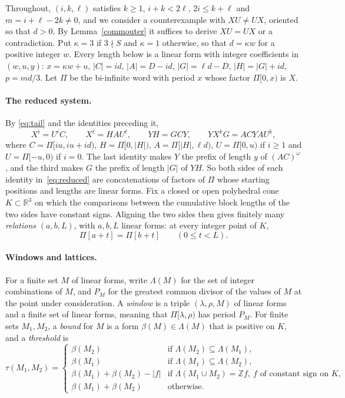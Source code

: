 Throughout, \((i,k,\ell)\) satisfies \(k\ge1\), \(i+k<2\ell\), \(2i\le k+\ell\) and \(m=i+\ell-2k\ne0\), and we consider a counterexample with \(XU\ne UX\), oriented so that \(d>0\). By Lemma~\ref{commouter} it suffices to derive \(XU=UX\) or a contradiction. Put \(\kappa=3\) if \(3\nmid S\) and \(\kappa=1\) otherwise, so that \(d=\kappa w\) for a positive integer \(w\). Every length below is a linear form with integer coefficients in \((w,u,y)\): \(x=\kappa w+u\), \(|C|=id\), \(|A|=D-id\), \(|G|=\ell d-D\), \(|H|=|G|+id\), \(p=md/3\). Let \(\Pi\) be the bi-infinite word with period \(x\) whose factor \(\Pi[0,x)\) is \(X\).

\paragraph{The reduced system.} By \eqref{eq:tail} and the identities preceding it,
\begin{equation}\label{eq:reduced}
X^i=U^iC,\qquad X^\ell=HAU^\ell,\qquad YH=GCY,\qquad YX^kG=ACYAU^k,
\end{equation}
where \(C=\Pi[iu,iu+id)\), \(H=\Pi[0,|H|)\), \(A=\Pi[|H|,\ell d)\), \(U=\Pi[0,u)\) if \(i\ge1\) and \(U=\Pi[-u,0)\) if \(i=0\). The last identity makes \(Y\) the prefix of length \(y\) of \((AC)^\omega\), and the third makes \(G\) the prefix of length \(|G|\) of \(YH\). So both sides of each identity in~\eqref{eq:reduced} are concatenations of factors of \(\Pi\) whose starting positions and lengths are linear forms. Fix a closed or open polyhedral cone \(K\subset\mathbb R^3\) on which the comparisons between the cumulative block lengths of the two sides have constant signs. Aligning the two sides then gives finitely many \emph{relations} \((a,b,L)\), with \(a,b,L\) linear forms: at every integer point of \(K\),
\[
\Pi[a+t]=\Pi[b+t]\qquad(0\le t<L).
\]

\paragraph{Windows and lattices.} For a finite set \(M\) of linear forms, write \(\Lambda(M)\) for the set of integer combinations of \(M\), and \(P_M\) for the greatest common divisor of the values of \(M\) at the point under consideration. A \emph{window} is a triple \((\lambda,\rho,M)\) of linear forms and a finite set of linear forms, meaning that \(\Pi[\lambda,\rho)\) has period \(P_M\). For finite sets \(M_1,M_2\), a \emph{bound} for \(M\) is a form \(\beta(M)\in\Lambda(M)\) that is positive on \(K\), and a \emph{threshold} is
\[
\tau(M_1,M_2)=\begin{cases}
\beta(M_2)&\text{if }\Lambda(M_2)\subseteq\Lambda(M_1),\\
\beta(M_1)&\text{if }\Lambda(M_1)\subseteq\Lambda(M_2),\\
\beta(M_1)+\beta(M_2)-|f|&\text{if }\Lambda(M_1\cup M_2)=\mathbb Z f,\ f\text{ of constant sign on }K,\\
\beta(M_1)+\beta(M_2)&\text{otherwise.}
\end{cases}
\]

